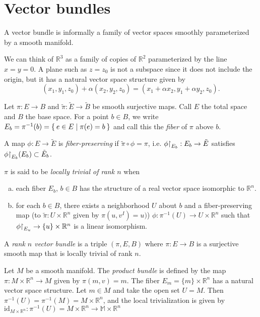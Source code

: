 \section{Vector bundles}

A vector bundle is informally a family of vector spaces smoothly
parameterized by a smooth manifold.

\begin{xmpl}
We can think of $\mathbb{R}^3$ as a family of copies of $\mathbb{R}^2$
parameterized by the line $x = y = 0$. A plane such as $z = z_0$ is not
a subspace since it does not include the origin, but it has a natural
vector space structure given by
$$
  (x_1, y_1, z_0) + \alpha(x_2, y_2, z_0)
= (x_1 + \alpha x_2, y_1 + \alpha y_2, z_0).
$$
\end{xmpl}

\begin{defn}
Let $\pi: E \to B$ and $\tilde{\pi}: \tilde{E} \to \tilde{B}$ be
smooth surjective maps. Call $E$ the total space and $B$ the base
space. For a point $b \in B$,
we write $E_b = \pi^{-1}(b) = \Set{e \in E | \pi(e) = b}$ and call
this the \emph{fiber} of $\pi$ above $b$.

A map $\phi: E \to \tilde{E}$ is \emph{fiber-preserving} if
$\tilde{\pi} \circ \phi = \pi$, i.e.
$\phi\mathord{\upharpoonright}_{E_b} : E_b \to \tilde{E}$ satisfies
$\phi\mathord{\upharpoonright}_{E_b} (E_b) \subset \tilde{E}_b$.

$\pi$ is said to be \emph{locally trivial of rank $n$} when
\begin{enumerate}[(a)]
  \item{
    each fiber $E_b$, $b \in B$ has the structure of a real vector
    space isomorphic to $\mathbb{R}^n$.
  }
  \item{
    for each $b \in B$, there exists a neighborhood $U$ about $b$ and
    a fiber-preserving map
    (to $\tilde{\pi} : U \times \mathbb{R}^n$ given by $\pi(u, v^I) = u)$)
    $\phi : \pi^{-1}(U) \to U \times \mathbb{R}^n$ such that
    $\phi\mathord{\upharpoonright}_{E_u} \to \{ u \} \times \mathbb{R}^n$ is a linear
    isomorphism.
  }
\end{enumerate}
A \emph{rank $n$ vector bundle} is a triple $(\pi, E, B)$ where
$\pi: E \to B$ is a surjective smooth map that is locally trivial of
rank $n$.
\end{defn}

\begin{xmpl}
Let $M$ be a smooth manifold. The \emph{product bundle} is defined by
the map $\pi: M \times \mathbb{R}^n \to M$ given by $\pi(m, v) =
m$. The fiber $E_m = \{m\} \times \mathbb{R}^n$ has a natural vector
space structure. Let $m \in M$ and take the open set $U = M$. Then
$\pi^{-1}(U) = \pi^{-1}(M) = M \times \mathbb{R}^n$, and the local
trivialization is given by
$\mathrm{id}_{M \times \mathbb{R}^n}: \pi^{-1}(U) = M \times \mathbb{R}^n \to \mathbb{M} \times
\mathbb{R}^n$
\end{xmpl}

